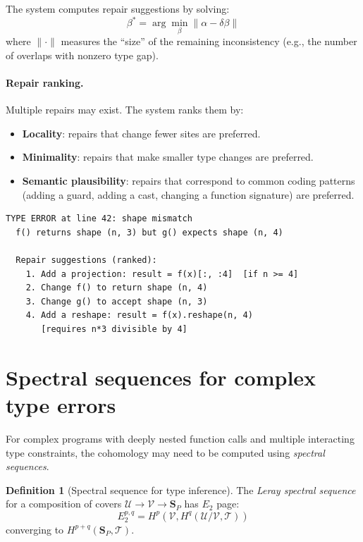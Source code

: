 \documentclass[11pt]{report}
\theoremstyle{definition}
\newtheorem{definition}{Definition}[section]
\theoremstyle{plain}
\begin{document}
The system computes repair suggestions by solving:
\[
  \beta^* = \arg\min_\beta \|\alpha - \delta\beta\|
\]
where $\|\cdot\|$ measures the ``size'' of the remaining inconsistency (e.g.,
the number of overlaps with nonzero type gap).

\paragraph{Repair ranking.}
Multiple repairs may exist. The system ranks them by:
\begin{itemize}[nosep]
  \item \textbf{Locality}: repairs that change fewer sites are preferred.
  \item \textbf{Minimality}: repairs that make smaller type changes are
        preferred.
  \item \textbf{Semantic plausibility}: repairs that correspond to common
        coding patterns (adding a guard, adding a cast, changing a function
        signature) are preferred.
\end{itemize}

\begin{lstlisting}[language={}]
TYPE ERROR at line 42: shape mismatch
  f() returns shape (n, 3) but g() expects shape (n, 4)

  Repair suggestions (ranked):
    1. Add a projection: result = f(x)[:, :4]  [if n >= 4]
    2. Change f() to return shape (n, 4)
    3. Change g() to accept shape (n, 3)
    4. Add a reshape: result = f(x).reshape(n, 4)
       [requires n*3 divisible by 4]
\end{lstlisting}

\section{Spectral sequences for complex type errors}

For complex programs with deeply nested function calls and multiple
interacting type constraints, the cohomology may need to be computed using
\emph{spectral sequences}.

\begin{definition}[Spectral sequence for type inference]
The \emph{Leray spectral sequence} for a composition of covers
$\mathcal{U} \to \mathcal{V} \to \mathbf{S}_P$ has $E_2$ page:
\[
  E_2^{p,q} = H^p(\mathcal{V}, H^q(\mathcal{U}/\mathcal{V}, \mathcal{T}))
\]
converging to $H^{p+q}(\mathbf{S}_P, \mathcal{T})$.
\end{definition}
\end{document}
